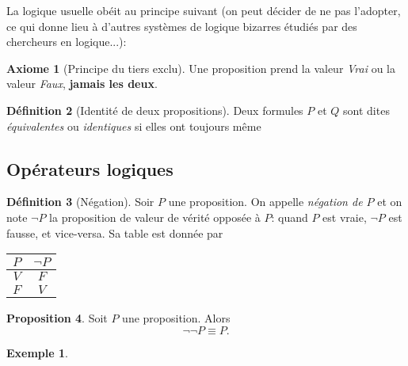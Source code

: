 \documentclass[11pt]{article}
\theoremstyle{definition}
\newtheorem{defn}{Définition}[section]
\newtheorem{prop}[defn]{Proposition}
\newtheorem{axio}[defn]{Axiome}
\newtheorem{exe}{Exemple}
\theoremstyle{remark}
\begin{document}
La logique usuelle obéit au principe suivant (on peut décider de ne pas l'adopter, ce qui donne lieu à d'autres systèmes de logique bizarres étudiés par des chercheurs en logique...):

\begin{axio}[Principe du tiers exclu]
Une proposition prend la valeur \textit{Vrai} ou la valeur \textit{Faux}, \textbf{jamais les deux}.
\end{axio}

\begin{defn}[Identité de deux propositions]
Deux formules $P$ et $Q$ sont dites \textit{équivalentes} ou \textit{identiques} si elles ont toujours même
\end{defn}

\subsection{Opérateurs logiques}

\begin{defn}[Négation]
Soir $P$ une proposition. On appelle \textit{négation de $P$} et on note $\neg P$ la proposition de valeur de vérité opposée à $P$: quand $P$ est vraie, $\neg P$ est fausse, et vice-versa. Sa table est donnée par
\begin{center}
  \begin{tabular}{|c|c|}\hline
  $P$ & $\neg P$ \\ \hline
  $V$ & $F$ \\ \hline
  $F$ & $V$ \\ \hline
  \end{tabular}
\end{center}
\end{defn}

\begin{prop}
Soit $P$ une proposition. Alors
\[\neg\neg P \equiv P.
\]
\end{prop}

\begin{exe}

\end{exe}
\end{document}
